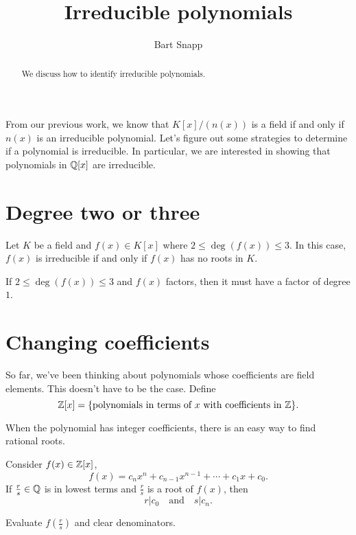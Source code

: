 \documentclass{ximera}
\author{Bart Snapp}
\title{Irreducible polynomials}
\begin{document}
\begin{abstract}
  We discuss how to identify irreducible polynomials.
\end{abstract}
\maketitle

From our previous work, we know that $K[x]/(n(x))$ is a field if and
only if $n(x)$ is an irreducible polynomial. Let's figure out some
strategies to determine if a polynomial is irreducible. In particular,
we are interested in showing that polynomials in $\mathbb Q[x]$ are
irreducible.

\section{Degree two or three}

\begin{lemma}\label{L:d23}
  Let $K$ be a field and $f(x)\in K[x]$ where $2 \le\deg(f(x))\le 3$. In
  this case, $f(x)$ is irreducible if and only if $f(x)$ has no roots
  in $K$.
  \begin{sketch}
    If $2 \le \deg(f(x))\le 3$ and $f(x)$ factors, then it must have a
    factor of degree $1$.
  \end{sketch}
\end{lemma}






\section{Changing coefficients}

So far, we've been thinking about polynomials whose coefficients are
field elements. This doesn't have to be the case. Define
\[
\mathbb Z[x] = \{\text{polynomials in terms of $x$ with coefficients in
  $\mathbb Z$}\}.
\]

When the polynomial has integer coefficients, there is an easy way to
find rational roots.

\begin{lemma}\label{L:rr}
  Consider $f(x) \in \mathbb Z[x]$,
  \[
  f(x) = c_nx^n + c_{n-1}x^{n-1} + \cdots + c_1 x + c_0.
  \]
  If $\frac{r}{s}\in\mathbb Q$ is in lowest terms and $\frac{r}{s}$ is a root
  of $f(x)$, then
  \[
  r | c_0 \quad\text{and}\quad s | c_n.
  \]
  \begin{sketch}
    Evaluate $f\left(\frac{r}{s}\right)$ and clear denominators.
  \end{sketch}
\end{lemma}
\end{document}
